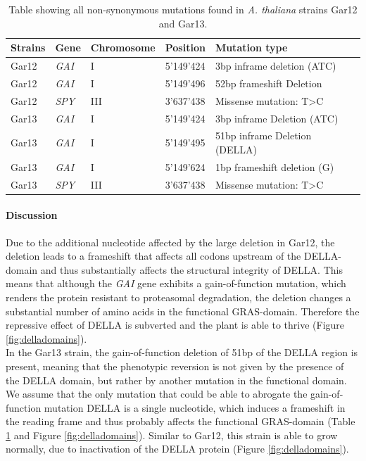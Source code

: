 \documentclass[10pt,a4paper]{article}
\begin{document}
\begin{table}[h]
	\centering
	
		\begin{tabular}{|l|l|l|l|l|}
			\hline
			Strains & Gene & Chromosome & Position & Mutation type \\ \hline
			Gar12 & \textit{GAI} & I & 5'149’424 & 3bp inframe deletion (ATC) \\ \hline
			Gar12 & \textit{GAI} & I & 5'149’496 & 52bp frameshift Deletion \\ \hline
			Gar12 & \textit{SPY} & III & 3'637’438 & Missense mutation: T\textgreater{}C \\ \hline
			Gar13 & \textit{GAI} & I & 5'149’424 & 3bp inframe Deletion (ATC) \\ \hline
			Gar13 & \textit{GAI} & I & 5'149’495 & 51bp inframe Deletion (DELLA) \\ \hline
			Gar13 & \textit{GAI} & I & 5'149’624 & 1bp frameshift deletion (G) \\ \hline
			Gar13 & \textit{SPY} & III & 3'637’438 & Missense mutation: T\textgreater{}C \\ \hline
		\end{tabular}
	\caption{Table showing all non-synonymous mutations found in \textit{A. thaliana} strains Gar12 and Gar13.}
	\label{tab:resultATH}
\end{table}

\paragraph{Discussion}

Due to the additional nucleotide affected by the large deletion in Gar12, the deletion leads to a frameshift that affects all codons upstream of the DELLA-domain and thus substantially affects the structural integrity of DELLA. This means that although the \textit{GAI} gene exhibits a gain-of-function mutation, which renders the protein resistant to proteasomal degradation, the deletion changes a substantial number of amino acids in the functional GRAS-domain. Therefore the repressive effect of DELLA is subverted and the plant is able to thrive (Figure \ref{fig:delladomains}).\\


\noindent In the Gar13 strain, the gain-of-function deletion of 51bp of the DELLA region is present, meaning that the phenotypic reversion is not given by the presence of the DELLA domain, but rather by another mutation in the functional domain. We assume that the only mutation that could be able to abrogate the gain-of-function mutation DELLA is a single nucleotide, which induces a frameshift in the reading frame and thus probably affects the functional GRAS-domain (Table \ref{tab:resultATH} and Figure \ref{fig:delladomains}). Similar to Gar12, this strain is able to grow normally, due to inactivation of the DELLA protein (Figure \ref{fig:delladomains}).
\end{document}

